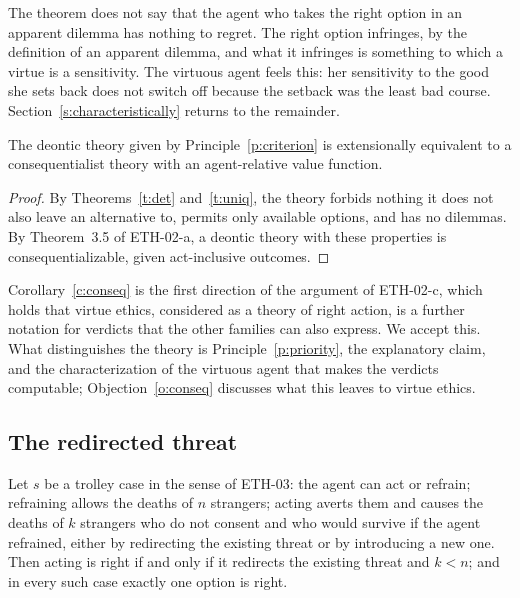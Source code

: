 \documentclass{situationist-preprint}
\begin{document}
The theorem does not say that the agent who takes the right option in an apparent dilemma has nothing to regret. The right option infringes, by the definition of an apparent dilemma, and what it infringes is something to which a virtue is a sensitivity. The virtuous agent feels this: her sensitivity to the good she sets back does not switch off because the setback was the least bad course. Section~\ref{s:characteristically} returns to the remainder.

\begin{corollary}[Consequentializability]\label{c:conseq}
The deontic theory given by Principle~\ref{p:criterion} is extensionally equivalent to a consequentialist theory with an agent-relative value function.
\end{corollary}

\begin{proof}
By Theorems~\ref{t:det} and~\ref{t:uniq}, the theory forbids nothing it does not also leave an alternative to, permits only available options, and has no dilemmas. By Theorem~3.5 of ETH-02-a, a deontic theory with these properties is consequentializable, given act-inclusive outcomes.
\end{proof}

Corollary~\ref{c:conseq} is the first direction of the argument of ETH-02-c, which holds that virtue ethics, considered as a theory of right action, is a further notation for verdicts that the other families can also express. We accept this. What distinguishes the theory is Principle~\ref{p:priority}, the explanatory claim, and the characterization of the virtuous agent that makes the verdicts computable; Objection~\ref{o:conseq} discusses what this leaves to virtue ethics.

\subsection{The redirected threat}

\begin{proposition}\label{p:drt}
Let $s$ be a trolley case in the sense of ETH-03: the agent can act or refrain; refraining allows the deaths of $n$ strangers; acting averts them and causes the deaths of $k$ strangers who do not consent and who would survive if the agent refrained, either by redirecting the existing threat or by introducing a new one. Then acting is right if and only if it redirects the existing threat and $k<n$; and in every such case exactly one option is right.
\end{proposition}
\end{document}
